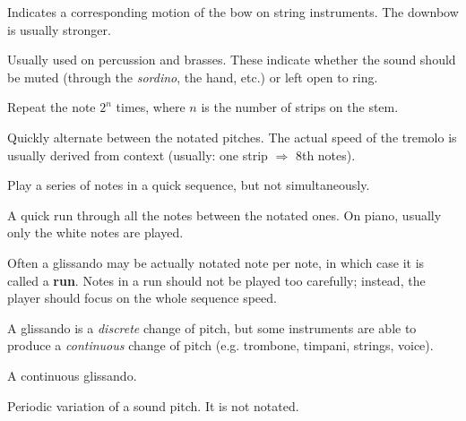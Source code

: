 \begin{definition}
    Indicates a corresponding motion of the bow on string instruments. The downbow is usually stronger.
\end{definition}

\begin{definition}
    Usually used on percussion and brasses. These indicate whether the sound should be muted (through the \emph{sordino}, the hand, etc.) or left open to ring.
\end{definition}

\begin{definition}
    Repeat the note $2^n$ times, where $n$ is the number of strips on the stem.
\end{definition}

\begin{definition}
    Quickly alternate between the notated pitches. The actual speed of the tremolo is usually derived from context (usually: one strip $\Rightarrow$ 8th notes).
\end{definition}

\begin{definition}[Arpeggio]
    Play a series of notes in a quick sequence, but not simultaneously.
\end{definition}

\begin{definition}[Glissando]
    A quick run through all the notes between the notated ones. On piano, usually only the white notes are played.
\end{definition}

Often a glissando may be actually notated note per note, in which case it is called a \textbf{run}. Notes in a run should not be played too carefully; instead, the player should focus on the whole sequence speed.

A glissando is a \emph{discrete} change of pitch, but some instruments are able to produce a \emph{continuous} change of pitch (e.g. trombone, timpani, strings, voice).

\begin{definition}[Portamento]
    A continuous glissando.
\end{definition}

\begin{definition}[Vibrato]
    Periodic variation of a sound pitch. It is not notated.
\end{definition}

